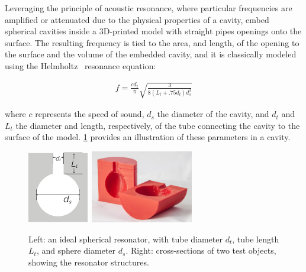         Leveraging the principle of acoustic resonance, where particular
        frequencies are amplified or attenuated due to the physical properties
        of a cavity, \bh embed spherical cavities inside a 3D-printed model
        with straight pipes openings onto the surface. The resulting frequency
        is tied to the area, and length, of the opening to the surface and the
        volume of the embedded cavity, and it is classically modeled using the
        Helmholtz~\cite{Helmholtz:1885vp} resonance equation:

        \begin{align*}\label{eq:hhz}
          f = \frac{cd_t}{\pi}\sqrt{\frac{3}{8(L_t+.75 d_t)d_s^3}}
        \end{align*}

        where $c$ represents the speed of sound, $d_s$ the diameter of the
        cavity, and $d_t$ and $L_t$ the diameter and length, respectively, of
        the tube connecting the cavity to the surface of the model.
        \cref{fig:resonator} provides an illustration of these parameters in a
        \bh cavity.

        \begin{figure}[H]
          \centering
            \includegraphics[height=1.25in]{figures/helmholtz_illustration}
            \quad
            \includegraphics[height=1.25in]{figures/cavities2}
            \caption{Left: an ideal spherical \hhz resonator, with tube
              diameter $d_t$, tube length $L_t$, and sphere diameter $d_s$.
              Right: cross-sections of two \bh test objects, showing the
              resonator structures.}
            \label{fig:resonator}
        \end{figure}

